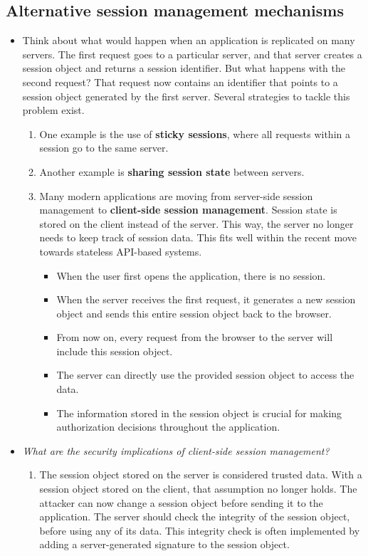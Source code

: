 \documentclass[../main.tex]{subfiles}
\begin{document}
\subsection{Alternative session management mechanisms}
\begin{itemize}
\item Think about what would happen when an application is replicated on many servers. The first request goes to a particular server, and that server creates a session object and returns a session identifier. But what happens with the second request? That request now contains an identifier that points to a session object generated by the first server. Several strategies to tackle this problem exist.
\begin{enumerate}
\item One example is the use of \textbf{sticky sessions}, where all requests within a session go to the same server.
\item Another example is \textbf{sharing session state} between servers.
\item Many modern applications are moving from server-side session management to \textbf{client-side session management}. Session state is stored on the client instead of the server. This way, the server no longer needs to keep track of session data. This fits well within the recent move towards stateless API-based systems.
\begin{itemize}
\item When the user first opens the application, there is no session.
\item When the server receives the first request, it generates a new session object and sends this entire session object back to the browser.
\item From now on, every request from the browser to the server will include this session object.
\item The server can directly use the provided session object to access the data.
\item The information stored in the session object is crucial for making authorization decisions throughout the application.
\end{itemize}
\end{enumerate}
\item \emph{What are the security implications of client-side session management?}
\begin{enumerate}
\item The session object stored on the server is considered trusted data. With a session object stored on the client, that assumption no longer holds. The attacker can now change a session object before sending it to the application. The server should check the integrity of the session object, before using any of its data. This integrity check is often implemented by adding a server-generated signature to the session object.

\end{enumerate}
\end{itemize}
\end{document}
